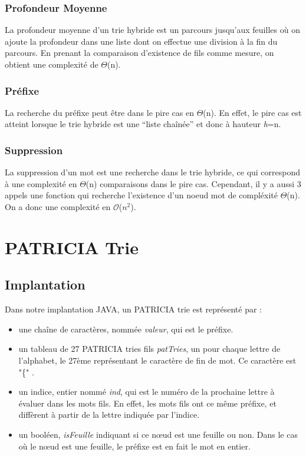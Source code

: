 \documentclass[a4paper,12pt]{report}
\begin{document}
\subsection{Profondeur Moyenne}
La profondeur moyenne d'un trie hybride est un parcours jusqu'aux feuilles où on ajoute la profondeur dans une liste dont on 
effectue une division à la fin du parcours. En prenant la comparaison d'existence de fils comme mesure, on obtient une complexité
de $\Theta$(n).

\subsection{Préfixe}
La recherche du préfixe peut être dans le pire cas en $\Theta$(n). En effet, le pire cas est atteint lorsque le trie hybride
est une ``liste chaînée'' et donc à hauteur \textit{h}=n.

\subsection{Suppression}
La suppression d'un mot est une recherche dans le trie hybride, ce qui correspond à une complexité en $\Theta$(n) comparaisons
dans le pire cas. Cependant, il y a aussi 3 appels une fonction qui recherche l'existence d'un noeud mot de compléxité $\Theta$(n).
On a donc une complexité en $\mathcal{O}$($n^2$).

\chapter{PATRICIA Trie}
\section{Implantation}
Dans notre implantation JAVA, un PATRICIA trie est représenté par :
\begin{itemize}
\item une chaîne de caractères, nommée {\itshape valeur}, qui est le préfixe.
\item un tableau de 27 PATRICIA tries fils {\itshape patTries}, un pour chaque lettre de l'alphabet, le 27ème représentant le caractère de fin de mot. Ce caractère est "\{" .
\item un indice, entier nommé {\itshape ind}, qui est le numéro de la prochaine lettre à évaluer dans les mots fils. En effet, les mots fils ont ce même préfixe, et diffèrent à partir de la lettre indiquée par l'indice.
\item un booléen, {\itshape isFeuille} indiquant si ce nœud est une feuille ou non. Dans le cas où le nœud est une feuille, le préfixe est en fait le mot en entier.
\end{itemize}
 \bigbreak
\end{document}

